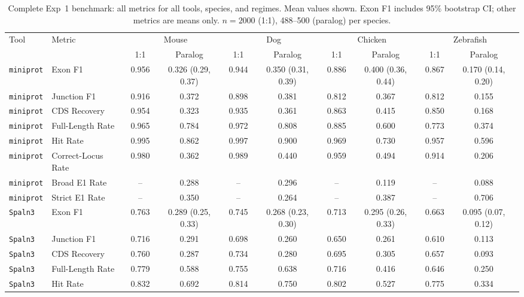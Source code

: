 \begin{table}[t]
\centering
\caption{Complete Exp~1 benchmark: all metrics for all tools, species, and regimes. Mean values shown. Exon F1 includes 95\% bootstrap CI; other metrics are means only. $n = 2000$ (1:1), 488--500 (paralog) per species.}
\label{tab:s1_full_benchmark}
\footnotesize
\setlength{\tabcolsep}{1.2pt}
\begin{tabular}{llcccccccc}
\toprule
Tool & Metric & \multicolumn{2}{c}{Mouse} & \multicolumn{2}{c}{Dog} & \multicolumn{2}{c}{Chicken} & \multicolumn{2}{c}{Zebrafish} \\
 & & 1:1 & Paralog& 1:1 & Paralog& 1:1 & Paralog& 1:1 & Paralog \\
\midrule
\texttt{miniprot} & Exon F1 & 0.956 & 0.326 (0.29, 0.37) & 0.944 & 0.350 (0.31, 0.39) & 0.886 & 0.400 (0.36, 0.44) & 0.867 & 0.170 (0.14, 0.20) \\
\texttt{miniprot} & Junction F1 & 0.916 & 0.372 & 0.898 & 0.381 & 0.812 & 0.367 & 0.812 & 0.155 \\
\texttt{miniprot} & CDS Recovery & 0.954 & 0.323 & 0.935 & 0.361 & 0.863 & 0.415 & 0.850 & 0.168 \\
\texttt{miniprot} & Full-Length Rate & 0.965 & 0.784 & 0.972 & 0.808 & 0.885 & 0.600 & 0.773 & 0.374 \\
\texttt{miniprot} & Hit Rate & 0.995 & 0.862 & 0.997 & 0.900 & 0.969 & 0.730 & 0.957 & 0.596 \\
\texttt{miniprot} & Correct-Locus Rate & 0.980 & 0.362 & 0.989 & 0.440 & 0.959 & 0.494 & 0.914 & 0.206 \\
\texttt{miniprot} & Broad E1 Rate & -- & 0.288 & -- & 0.296 & -- & 0.119 & -- & 0.088 \\
\texttt{miniprot} & Strict E1 Rate & -- & 0.350 & -- & 0.264 & -- & 0.387 & -- & 0.706 \\
\midrule
\texttt{Spaln3} & Exon F1 & 0.763 & 0.289 (0.25, 0.33) & 0.745 & 0.268 (0.23, 0.30) & 0.713 & 0.295 (0.26, 0.33) & 0.663 & 0.095 (0.07, 0.12) \\
\texttt{Spaln3} & Junction F1 & 0.716 & 0.291 & 0.698 & 0.260 & 0.650 & 0.261 & 0.610 & 0.113 \\
\texttt{Spaln3} & CDS Recovery & 0.760 & 0.287 & 0.734 & 0.280 & 0.695 & 0.305 & 0.657 & 0.093 \\
\texttt{Spaln3} & Full-Length Rate & 0.779 & 0.588 & 0.755 & 0.638 & 0.716 & 0.416 & 0.646 & 0.250 \\
\texttt{Spaln3} & Hit Rate & 0.832 & 0.692 & 0.814 & 0.750 & 0.802 & 0.527 & 0.775 & 0.334 \\

\end{tabular}
\end{table}
